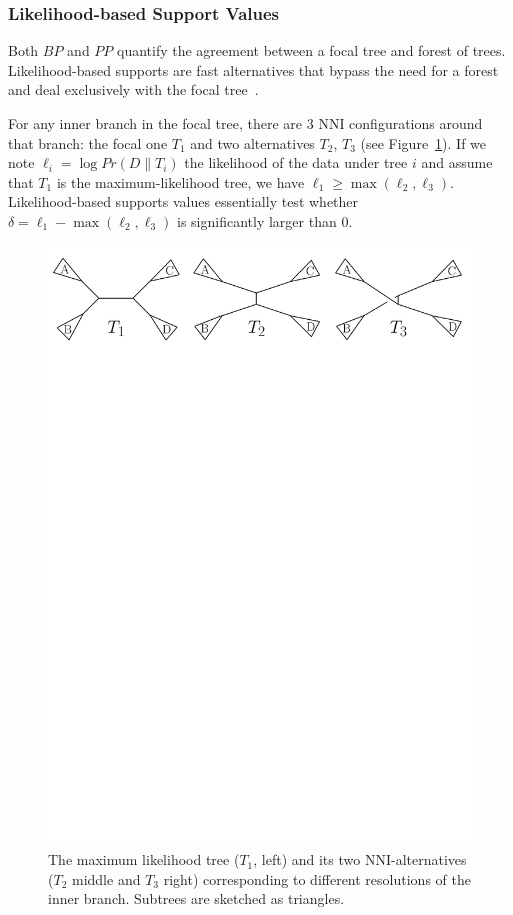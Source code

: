 \subsubsection{Likelihood-based Support Values} \label{sec:other-confidence}

Both $BP$ and $PP$ quantify the agreement between a focal tree and forest of trees. Likelihood-based supports are fast alternatives that bypass the need for a forest and deal exclusively with the focal tree~\citep{Anisimova2006}. 

For any inner branch in the focal tree, there are $3$ NNI configurations around that branch: the focal one $T_1$ and two alternatives $T_2$, $T_3$ (see Figure~\ref{fig:nni}). If we note $\ell_i = \log Pr(D \| T_i)$ the likelihood of the data under tree $i$ and assume that $T_1$ is the maximum-likelihood tree, we have $\ell_1 \geq \max(\ell_2, \ell_3)$. Likelihood-based supports values essentially test whether $\delta = \ell_1 - \max(\ell_2, \ell_3)$ is significantly larger than $0$. 

\begin{figure}
 \includegraphics[width=0.9\linewidth]{Figs/NNI}
 \caption{The maximum likelihood tree ($T_1$, left) and its two NNI-alternatives ($T_{2}$ middle and $T_{3}$ right) corresponding to different resolutions of the inner branch. Subtrees are sketched as triangles.}
 \label{fig:nni}
\end{figure}


